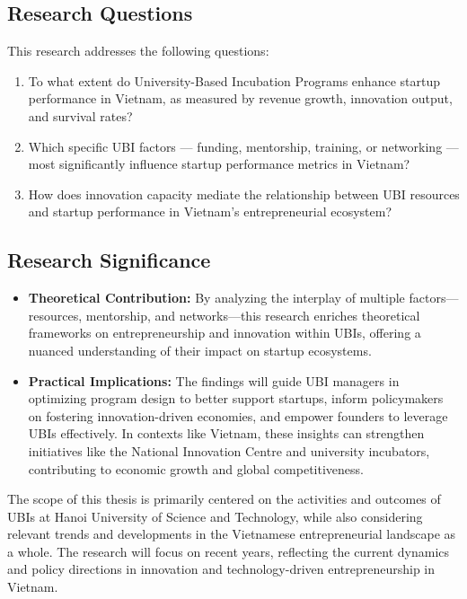 \documentclass[../Main.tex]{subfiles}
\begin{document}
	\subsection{Research Questions}
	This research addresses the following questions:
	\begin{enumerate}
		\item To what extent do University-Based Incubation Programs enhance startup performance in Vietnam, as measured by revenue growth, innovation output, and survival rates?
		\item Which specific UBI factors — funding, mentorship, training, or networking — most significantly influence startup performance metrics in Vietnam?
		\item How does innovation capacity mediate the relationship between UBI resources and startup performance in Vietnam's entrepreneurial ecosystem?
	\end{enumerate}

	\subsection{Research Significance}
	\begin{itemize}
		\item \textbf{Theoretical Contribution:} By analyzing the interplay of multiple factors—resources, mentorship, and networks—this research enriches theoretical frameworks on entrepreneurship and innovation within UBIs, offering a nuanced understanding of their impact on startup ecosystems.
		\item \textbf{Practical Implications:} The findings will guide UBI managers in optimizing program design to better support startups, inform policymakers on fostering innovation-driven economies, and empower founders to leverage UBIs effectively. In contexts like Vietnam, these insights can strengthen initiatives like the National Innovation Centre and university incubators, contributing to economic growth and global competitiveness.
	\end{itemize}

	\begin{condensed_idea}
		The scope of this thesis is primarily centered on the activities and outcomes of UBIs at Hanoi University of Science and Technology, while also considering relevant trends and developments in the Vietnamese entrepreneurial landscape as a whole. The research will focus on recent years, reflecting the current dynamics and policy directions in innovation and technology-driven entrepreneurship in Vietnam.
	\end{condensed_idea}
\end{document}
